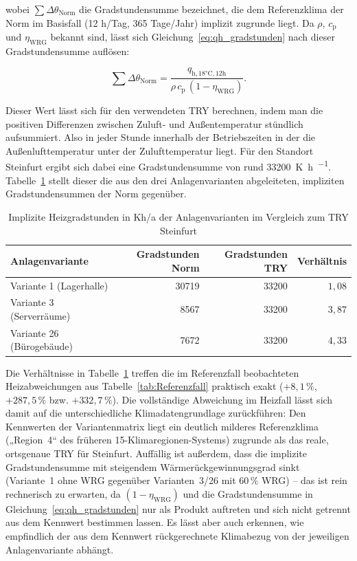 \documentclass{scrreprt}
\begin{document}
wobei $\sum \Delta\theta_{\mathrm{Norm}}$ die Gradstundensumme
bezeichnet, die dem Referenzklima der Norm im Basisfall (12 h/Tag,
365 Tage/Jahr) implizit zugrunde liegt. Da $\rho$, $c_{\mathrm{p}}$
und $\eta_{\mathrm{WRG}}$ bekannt sind, lässt sich
Gleichung~\eqref{eq:qh_gradstunden} nach dieser Gradstundensumme
auflösen:

\begin{equation}\label{eq:gradstunden_norm}
    \sum \Delta\theta_{\mathrm{Norm}} = \frac{q_{\mathrm{h,18°C,12h}}}{\rho \, c_{\mathrm{p}} \, (1-\eta_{\mathrm{WRG}})}.
\end{equation}

Dieser Wert lässt sich für den verwendeten \ac{TRY} berechnen, indem man die positiven Differenzen zwischen Zuluft- und Außentemperatur stündlich aufsummiert. Also in jeder Stunde innerhalb der Betriebszeiten in der die Außenlufttemperatur unter der Zulufttemperatur liegt. Für den
Standort Steinfurt ergibt sich dabei eine Gradstundensumme von rund
\SI{33200}{\kelvin\hour\per\year}. Tabelle~\ref{tab:Gradstunden} stellt dieser
die aus den drei Anlagenvarianten abgeleiteten, impliziten
Gradstundensummen der Norm gegenüber.

\begin{table}[H]
    \centering
    \caption{Implizite Heizgradstunden in Kh/a der Anlagenvarianten im Vergleich zum TRY Steinfurt}
    \label{tab:Gradstunden}
    \begin{tabular}{lrrr}
        \toprule
        Anlagenvariante & Gradstunden Norm & Gradstunden TRY & Verhältnis \\
        \midrule
        Variante 1 (Lagerhalle) & \num{30719} & \num{33200} & $1{,}08$ \\
        Variante 3 (Serverräume) & \num{8567} & \num{33200} & $3{,}87$ \\
        Variante 26 (Bürogebäude) & \num{7672} & \num{33200} & $4{,}33$ \\
        \bottomrule
    \end{tabular}
\end{table}

Die Verhältnisse in Tabelle~\ref{tab:Gradstunden} treffen die im
Referenzfall beobachteten Heizabweichungen aus
Tabelle~\ref{tab:Referenzfall} praktisch exakt ($+8{,}1\,\%$,
$+287{,}5\,\%$ bzw. $+332{,}7\,\%$). Die vollständige Abweichung im
Heizfall lässt sich damit auf die unterschiedliche
Klimadatengrundlage zurückführen: Den Kennwerten der
Variantenmatrix liegt ein deutlich milderes Referenzklima
(„Region~4“ des früheren 15-Klimaregionen-Systems) zugrunde als das
reale, ortsgenaue \ac{TRY} für Steinfurt. Auffällig ist außerdem, dass
die implizite Gradstundensumme mit steigendem
Wärmerückgewinnungsgrad sinkt (Variante~1 ohne WRG gegenüber
Varianten~3/26 mit $60\,\%$ WRG) -- das ist rein rechnerisch zu
erwarten, da $(1-\eta_{\mathrm{WRG}})$ und die Gradstundensumme in
Gleichung~\eqref{eq:qh_gradstunden} nur als Produkt auftreten und sich
nicht getrennt aus dem Kennwert bestimmen lassen. Es lässt aber auch
erkennen, wie empfindlich der aus dem Kennwert rückgerechnete
Klimabezug von der jeweiligen Anlagenvariante abhängt.
\end{document}
